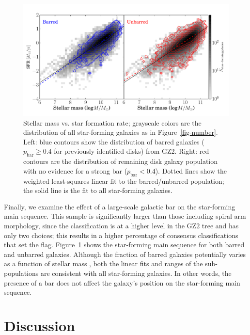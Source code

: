 \documentclass{emulateapj}
\begin{document}
\begin{figure}
\includegraphics[angle=0,width=7.0in]{figures/ms_bar_contour.pdf}
\caption{Stellar mass vs. star formation rate; grayscale colors are the distribution of all star-forming galaxies as in Figure~\ref{fig-number}. Left: blue contours show the distribution of barred galaxies ($p_\textrm{bar}\ge0.4$ for previously-identified disks) from GZ2. Right: red contours are the distribution of remaining disk galaxy population with no evidence for a strong bar ($p_\textrm{bar}<0.4$). Dotted lines show the weighted least-squares linear fit to the barred/unbarred population; the solid line is the fit to all star-forming galaxies. 
\label{fig-bar}}
\end{figure}

Finally, we examine the effect of a large-scale galactic bar on the star-forming main sequence. This sample is significantly larger than those including spiral arm morphology, since the classification is at a higher level in the GZ2 tree and has only two choices; this results in a higher percentage of consensus classifications that set the flag. Figure~\ref{fig-bar} shows the star-forming main sequence for both barred and unbarred galaxies. Although the fraction of barred galaxies potentially varies as a function of stellar mass \citep{mas11c}, both the linear fits and ranges of the sub-populations are consistent with all star-forming galaxies. In other words, the presence of a bar does not affect the galaxy's position on the star-forming main sequence. 


\section{Discussion}\label{sec-discussion}
\end{document}
